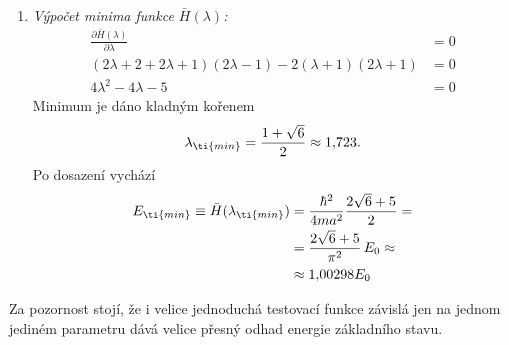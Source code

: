\begin{solution}
\begin{enumerate}
	\item
		\emph{Výpočet minima funkce $\bar{H}(\lambda)$:}
		\begin{align}
			\frac{\partial{\bar{H}(\lambda)}}{\partial\lambda}&=0\nonumber\\
			(2\lambda+2+2\lambda+1)(2\lambda-1)-2(\lambda+1)(2\lambda+1)&=0\nonumber\\
			4\lambda^{2}-4\lambda-5&=0
		\end{align}
		Minimum je dáno kladným kořenem
		\begin{equation}
			\lambda_{\ti{min}}=\frac{1+\sqrt{6}}{2}\approx1,\!723.
		\end{equation}
		Po dosazení vychází
		\begin{align}
			E_{\ti{min}}\equiv\bar{H}(\lambda_{\ti{min}})&=\frac{\hbar^{2}}{4ma^{2}}\frac{2\sqrt{6}+5}{2}=\nonumber\\
				&=\frac{2\sqrt{6}+5}{\pi^{2}}\,E_{0}\approx\nonumber\\
				&\approx1,\!00298 E_{0}
		\end{align}
	\end{enumerate}

	Za pozornost stojí, že i velice jednoduchá testovací funkce závislá jen na jednom jediném parametru
	dává velice přesný odhad energie základního stavu.
\end{solution}
